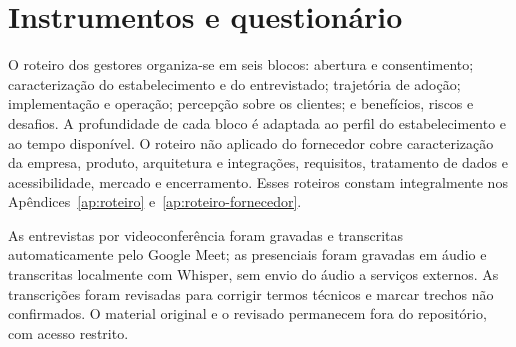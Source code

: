 \begin{figure}[!ht]
\end{figure}

\section{Instrumentos e questionário}

O roteiro dos gestores organiza-se em seis blocos: abertura e consentimento; caracterização do estabelecimento e do entrevistado; trajetória de adoção; implementação e operação; percepção sobre os clientes; e benefícios, riscos e desafios. A profundidade de cada bloco é adaptada ao perfil do estabelecimento e ao tempo disponível. O roteiro não aplicado do fornecedor cobre caracterização da empresa, produto, arquitetura e integrações, requisitos, tratamento de dados e acessibilidade, mercado e encerramento. Esses roteiros constam integralmente nos Apêndices~\ref{ap:roteiro} e~\ref{ap:roteiro-fornecedor}.

As entrevistas por videoconferência foram gravadas e transcritas automaticamente pelo Google Meet; as presenciais foram gravadas em áudio e transcritas localmente com Whisper, sem envio do áudio a serviços externos. As transcrições foram revisadas para corrigir termos técnicos e marcar trechos não confirmados. O material original e o revisado permanecem fora do repositório, com acesso restrito.

